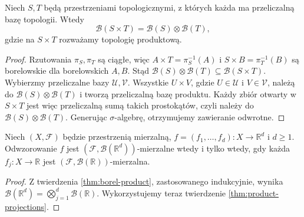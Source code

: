 \begin{twierdzenie}
\label{thm:borel-product}
Niech $S,T$ będą przestrzeniami topologicznymi, z których
każda ma przeliczalną bazę topologii. Wtedy
\[
\mathcal B(S\times T)=\mathcal B(S)\otimes\mathcal B(T),
\]
gdzie na $S\times T$ rozważamy topologię produktową.
\end{twierdzenie}
\begin{proof}
Rzutowania $\pi_S,\pi_T$ są ciągłe, więc
$A\times T=\pi_S^{-1}(A)$ i $S\times B=\pi_T^{-1}(B)$
są borelowskie dla borelowskich $A,B$.
Stąd $\mathcal B(S)\otimes\mathcal B(T)\subseteq
\mathcal B(S\times T)$.
Wybierzmy przeliczalne bazy $\mathcal U,\mathcal V$.
Wszystkie $U\times V$, gdzie $U\in\mathcal U$ i
$V\in\mathcal V$, należą do
$\mathcal B(S)\otimes\mathcal B(T)$ i tworzą
przeliczalną bazę produktu. Każdy zbiór otwarty
w $S\times T$ jest więc przeliczalną sumą takich
prostokątów, czyli należy do $\mathcal B(S)\otimes\mathcal B(T)$.
Generując $\sigma$-algebrę, otrzymujemy zawieranie odwrotne.
\end{proof}

\begin{wniosek}
\label{cor:coordinate-measurable}
Niech $(X,\mathcal F)$ będzie przestrzenią mierzalną,
$f=(f_1,\ldots,f_d):X\to\mathbb R^d$ i $d\ge1$.
Odwzorowanie $f$ jest $(\mathcal F,\mathcal B(\mathbb R^d))$-mierzalne
wtedy i tylko wtedy, gdy każda $f_j:X\to\mathbb R$
jest $(\mathcal F,\mathcal B(\mathbb R))$-mierzalna.
\end{wniosek}
\begin{proof}
Z twierdzenia \ref{thm:borel-product}, zastosowanego
indukcyjnie, wynika
$\mathcal B(\mathbb R^d)=\bigotimes_{j=1}^d\mathcal B(\mathbb R)$.
Wykorzystujemy teraz twierdzenie \ref{thm:product-projections}.
\end{proof}

